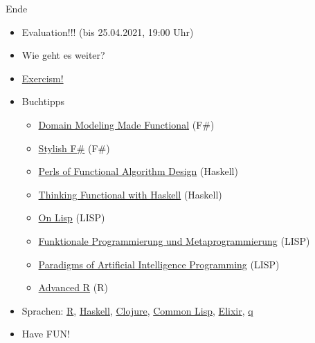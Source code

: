 \documentclass[t]{beamer}
\begin{document}
\begin{frame}[label={sec:orgc23961f}]{Ende}
\begin{itemize}
\item \alert{Evaluation!!!} (bis 25.04.2021, 19:00 Uhr)
\item Wie geht es weiter?
\item \href{https://exercism.io}{Exercism!}
\item Buchtipps
\begin{itemize}
\item \href{https://pragprog.com/book/swdddf/domain-modeling-made-functional}{Domain Modeling Made Functional} (F\#)
\item \href{https://www.apress.com/gp/book/9781484239995}{Stylish F\#} (F\#)
\item \href{https://www.cambridge.org/core/books/pearls-of-functional-algorithm-design/B0CF0AC5A205AF9491298684113B088F\#}{Perls of Functional Algorithm Design} (Haskell)
\item \href{https://www.cs.ox.ac.uk/publications/books/functional/}{Thinking Functional with Haskell} (Haskell)
\item \href{http://www.paulgraham.com/onlisp.html}{On Lisp} (LISP)
\item \href{http://www.iqool.de/FPMP.html}{Funktionale Programmierung und Metaprogrammierung} (LISP)
\item \href{https://github.com/norvig/paip-lisp}{Paradigms of Artificial Intelligence Programming} (LISP)
\item \href{https://adv-r.hadley.nz/}{Advanced R} (R)
\end{itemize}
\item Sprachen: \href{https://www.r-project.org/}{R}, \href{https://www.haskell.org/}{Haskell}, \href{https://clojure.org/}{Clojure}, \href{https://lisp-lang.org/}{Common Lisp}, \href{https://elixir-lang.org/}{Elixir}, \href{https://code.kx.com/q/}{q}

\item \alert{\alert{Have FUN!}}
\end{itemize}
\end{frame}
\end{document}
